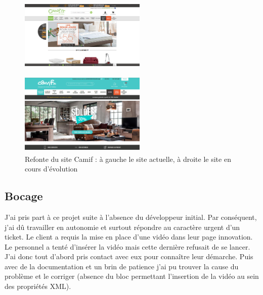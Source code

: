 \documentclass[12pt, a4paper, twoside]{report}
\begin{document}
\begin{figure}[H]
	
	\begin{minipage}[b]{0.45\linewidth}
		\centering
		\includegraphics[width=6cm,height=4cm]{Images/CamifPre.PNG}     
	\end{minipage}
	\hfill
	\begin{minipage}[b]{0.45\linewidth}
		\centering
		\includegraphics[width=6cm,height=4cm]{Images/CamifPost.png}     
	\end{minipage}
	
	\caption{Refonte du site Camif : à gauche le site actuelle, à droite le site en cours d'évolution}
	
\end{figure}

\subsection{Bocage}

J'ai pris part à ce projet suite à l'absence du développeur initial. Par conséquent, j'ai dû travailler en autonomie et surtout répondre au caractère urgent d'un ticket. Le client a requis la mise en place d'une vidéo dans leur page innovation. Le personnel a tenté d'insérer la vidéo mais cette dernière refusait de se lancer. J'ai donc tout d'abord pris contact avec eux pour connaître leur démarche. Puis avec de la documentation et un brin de patience j'ai pu trouver la cause du problème et le corriger (absence du bloc permettant l'insertion de la vidéo au sein des propriétés XML). \\
\end{document}
